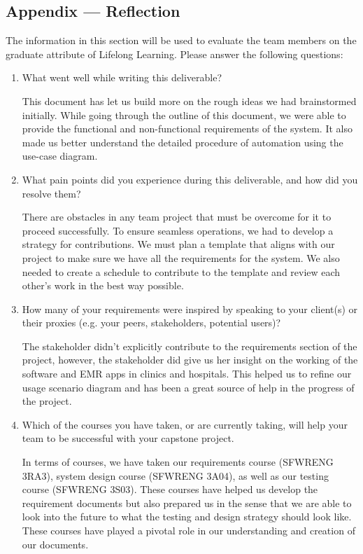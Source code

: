 \documentclass[12pt]{article}
\begin{document}
\begin{itemize}
\newpage{}
\section*{Appendix --- Reflection}

The information in this section will be used to evaluate the team members on the
graduate attribute of Lifelong Learning.  Please answer the following questions:

\begin{enumerate}
  \item What went well while writing this deliverable?
  
  This document has let us build more on the rough ideas we had brainstormed initially. While going through the outline of this document, we were able to provide the functional and non-functional requirements of the system. It also made us better understand the detailed procedure of automation using the use-case diagram. 

  \item What pain points did you experience during this deliverable, and how did
  you resolve them?

  There are obstacles in any team project that must be overcome for it to proceed successfully. To ensure seamless operations, we had to develop a strategy for contributions. We must plan a template that aligns with our project to make sure we have all the requirements for the system. We also needed to create a schedule to contribute to the template and review each other's work in the best way possible.
  
  \item How many of your requirements were inspired by speaking to your
  client(s) or their proxies (e.g. your peers, stakeholders, potential users)?

  The stakeholder didn't explicitly contribute to the requirements section of the project, however, the stakeholder did give us her insight on the working of the software and EMR apps in clinics and hospitals. This helped us to refine our usage scenario diagram and has been a great source of help in the progress of the project.

  \item Which of the courses you have taken, or are currently taking, will help
  your team to be successful with your capstone project.

  In terms of courses, we have taken our requirements course (SFWRENG 3RA3), system design course (SFWRENG 3A04), as well as our testing course (SFWRENG 3S03). These courses have helped us develop the requirement documents but also prepared us in the sense that we are able to look into the future to what the testing and design strategy should look like. These courses have played a pivotal role in our understanding and creation of our documents. 


\end{enumerate}
\end{itemize}
\end{document}
